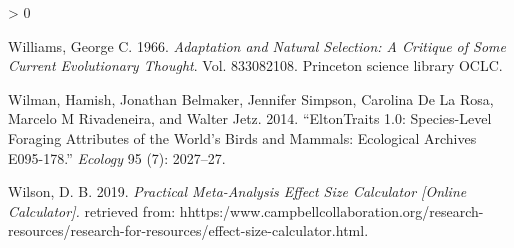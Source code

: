\documentclass[
]{article}
\newlength{\cslhangindent}
\newenvironment{CSLReferences}[2] %
 {%
  \setlength{\parindent}{0pt}
  \ifodd #1 \everypar{\setlength{\hangindent}{\cslhangindent}}\ignorespaces\fi
  \ifnum #2 > 0
  \setlength{\parskip}{#2\baselineskip}
  \fi
 }%
 {}
\begin{document}
\begin{CSLReferences}{1}{0}
\leavevmode\hypertarget{ref-williams1966adaptation}{}%
Williams, George C. 1966. \emph{Adaptation and Natural Selection: A
Critique of Some Current Evolutionary Thought}. Vol. 833082108.
Princeton science library OCLC.

\leavevmode\hypertarget{ref-wilman2014eltontraits}{}%
Wilman, Hamish, Jonathan Belmaker, Jennifer Simpson, Carolina De La
Rosa, Marcelo M Rivadeneira, and Walter Jetz. 2014. {``EltonTraits 1.0:
Species-Level Foraging Attributes of the World's Birds and Mammals:
Ecological Archives E095-178.''} \emph{Ecology} 95 (7): 2027--27.

\leavevmode\hypertarget{ref-wilson2019calculator}{}%
Wilson, D. B. 2019. \emph{Practical Meta-Analysis Effect Size Calculator
{[}Online Calculator{]}.} retrieved from:
hhttps:/www.campbellcollaboration.org/research-resources/research-for-resources/effect-size-calculator.html.

\end{CSLReferences}
\end{document}
